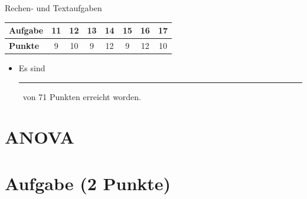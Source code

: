\documentclass[a4paper, 9pt]{scrartcl}\usepackage[]{graphicx}\usepackage[]{xcolor}
\begin{document}
\begin{graybox}{Rechen- und Textaufgaben}
  \begin{center}
    \large
    \begin{tabular}{|l|c|c|c|c|c|c|c|}
      \hline
      \textbf{Aufgabe} & \textbf{11} & \textbf{12} & \textbf{13} & \textbf{14} & \textbf{15} & \textbf{16} & \textbf{17} \strut\\
      \hline
      \textbf{Punkte} & 
      \hspace{1Ex}\Large\textcolor{gray!70}{9}\hspace{1Ex}  & 
      \hspace{1Ex}\Large\textcolor{gray!70}{10}\hspace{1Ex}  & 
      \hspace{1Ex}\Large\textcolor{gray!70}{9}\hspace{1Ex}  & 
      \hspace{1Ex}\Large\textcolor{gray!70}{12}\hspace{1Ex}  & 
      \hspace{1Ex}\Large\textcolor{gray!70}{9}\hspace{1Ex}  & 
      \hspace{1Ex}\Large\textcolor{gray!70}{12}\hspace{1Ex}  & 
      \hspace{1Ex}\Large\textcolor{gray!70}{10}\hspace{1Ex} \strut\\
      \hline
  \end{tabular}
\end{center}
\begin{itemize}
\item Es sind \rule[0ex]{2em}{.4pt}\, von 71 Punkten erreicht worden.
\end{itemize}
\end{graybox}

\clearpage

\section*{ANOVA}

\section{Aufgabe \hfill (2 Punkte)}
\end{document}
